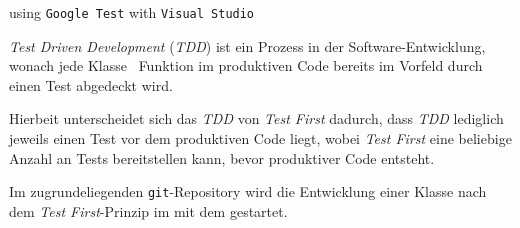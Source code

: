 using \texttt{Google Test} with \texttt{Visual Studio}






\textit{Test Driven Development} (\textit{TDD}) ist ein Prozess in der Software-Entwicklung, wonach jede Klasse \bzw\ Funktion im produktiven Code bereits im Vorfeld durch einen Test abgedeckt wird.

Hierbeit unterscheidet sich das \textit{TDD} von \textit{Test First} dadurch, dass \textit{TDD} lediglich jeweils einen Test vor dem produktiven Code liegt, wobei \textit{Test First} eine beliebige Anzahl an Tests bereitstellen kann, bevor produktiver Code entsteht. 

Im zugrundeliegenden \texttt{git}-Repository wird die Entwicklung einer Klasse nach dem \textit{Test First}-Prinzip im  mit dem  gestartet.

